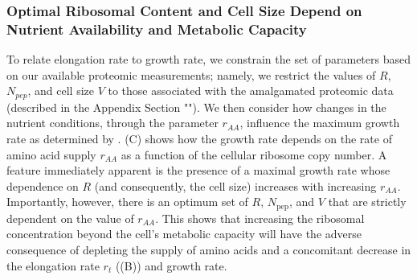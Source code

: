{\begin{figure}
{        \label{figsupp:model_explorer}

        }
\end{figure}

\subsubsection{Optimal Ribosomal Content and Cell Size Depend on Nutrient
Availability and Metabolic Capacity}
To relate elongation rate to growth rate, we constrain the set of parameters
based on our available proteomic measurements; namely, we restrict the values of
$R$, $N_{pep}$, and cell size $V$ to those associated with the amalgamated
proteomic data (described in the Appendix Section
""). We then consider how changes in the
nutrient conditions, through the parameter $r_{AA}$, influence the maximum
growth rate as determined by . (C)
shows how the growth rate depends on the rate of amino acid supply $r_{AA}$ as a
function of the cellular ribosome copy number. A feature immediately apparent is
the presence of a maximal growth rate whose dependence on $R$ (and consequently,
the cell size) increases with increasing $r_{AA}$. Importantly, however, there
is an optimum set of $R$, $N_\text{pep}$, and $V$ that are strictly dependent on
the value of $r_{AA}$. This shows that increasing the ribosomal concentration
beyond the cell's metabolic capacity will have the adverse consequence of
depleting the supply of amino acids and a concomitant decrease in the elongation
rate $r_t$ ((B)) and growth rate.

}
